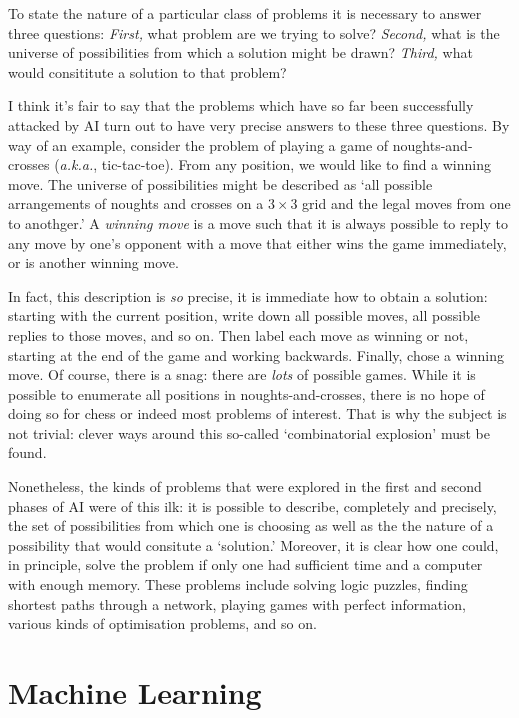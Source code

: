 \documentclass[10pt, a4paper, twocolumn]{article}
\begin{document}
To state the nature of a particular class of problems it is necessary to answer
three questions: \emph{First,} what problem are we trying to solve?
\emph{Second,} what is the universe of possibilities from which a solution might
be drawn? \emph{Third,} what would consititute a solution to that problem?

I think it's fair to say that the problems which have so far been successfully
attacked by AI turn out to have very precise answers to these three
questions. By way of an example, consider the problem of playing a game of
noughts-and-crosses (\emph{a.k.a.}, tic-tac-toe). From any position, we would
like to find a winning move. The universe of possibilities might be described as
`all possible arrangements of noughts and crosses on a $3\times3$ grid and the legal
moves from one to anothger.' A \emph{winning move} is a move such that it is
always possible to reply to any move by one's opponent with a move that either
wins the game immediately, or is another winning move.

In fact, this description is \emph{so} precise, it is immediate how to obtain a
solution: starting with the current position, write down all possible moves, all
possible replies to those moves, and so on. Then label each move as winning or
not, starting at the end of the game and working backwards. Finally, chose a
winning move. Of course, there is a snag: there are \emph{lots} of possible
games. While it is possible to enumerate all positions in noughts-and-crosses,
there is no hope of doing so for chess or indeed most problems of interest. That
is why the subject is not trivial: clever ways around this so-called
`combinatorial explosion' must be found.

Nonetheless, the kinds of problems that were explored in the first and second
phases of AI were of this ilk: it is possible to describe, completely and
precisely, the set of possibilities from which one is choosing as well as the
the nature of a possibility that would consitute a `solution.' Moreover, it is
clear how one could, in principle, solve the problem if only one had sufficient
time and a computer with enough memory. These problems include solving logic
puzzles, finding shortest paths through a network, playing games with perfect
information, various kinds of optimisation problems, and so on.

\section{Machine Learning}
\end{document}

